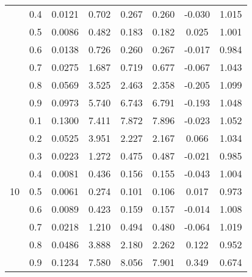 \documentclass[11pt,a4paper]{report}
\begin{document}
\begin{longtable}{ | c | c || c | c | c | c | c | c | }
 & 0.4 & 0.0121 & 0.702 & 0.267 & 0.260 & -0.030 & 1.015 \\
 & 0.5 & 0.0086 & 0.482 & 0.183 & 0.182 & 0.025 & 1.001 \\
 & 0.6 & 0.0138 & 0.726 & 0.260 & 0.267 & -0.017 & 0.984 \\
 & 0.7 & 0.0275 & 1.687 & 0.719 & 0.677 & -0.067 & 1.043 \\
 & 0.8 & 0.0569 & 3.525 & 2.463 & 2.358 & -0.205 & 1.099 \\
 & 0.9 & 0.0973 & 5.740 & 6.743 & 6.791 & -0.193 & 1.048 \\
 \hline
\multirow{9}{*}{10} & 0.1 & 0.1300 & 7.411 & 7.872 & 7.896 & -0.023 & 1.052 \\
 & 0.2 & 0.0525 & 3.951 & 2.227 & 2.167 & 0.066 & 1.034 \\
 & 0.3 & 0.0223 & 1.272 & 0.475 & 0.487 & -0.021 & 0.985 \\
 & 0.4 & 0.0081 & 0.436 & 0.156 & 0.155 & -0.043 & 1.004 \\
 & 0.5 & 0.0061 & 0.274 & 0.101 & 0.106 & 0.017 & 0.973 \\
 & 0.6 & 0.0089 & 0.423 & 0.159 & 0.157 & -0.014 & 1.008 \\
 & 0.7 & 0.0218 & 1.210 & 0.494 & 0.480 & -0.064 & 1.019 \\
 & 0.8 & 0.0486 & 3.888 & 2.180 & 2.262 & 0.122 & 0.952 \\
 & 0.9 & 0.1234 & 7.580 & 8.056 & 7.901 & 0.349 & 0.674 \\
 \hline
\hline
\end{longtable}
\end{document}
